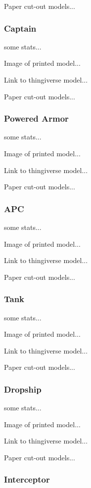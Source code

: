 \documentclass{article}
\begin{document}
Paper cut-out models...

\subsubsection{Captain}

some stats...

Image of printed model...

Link to thingiverse model...

Paper cut-out models...

\subsubsection{Powered Armor}

some stats...

Image of printed model...

Link to thingiverse model...

Paper cut-out models...

\subsubsection{APC}

some stats...

Image of printed model...

Link to thingiverse model...

Paper cut-out models...

\subsubsection{Tank}

some stats...

Image of printed model...

Link to thingiverse model...

Paper cut-out models...

\subsubsection{Dropship}

some stats...

Image of printed model...

Link to thingiverse model...

Paper cut-out models...

\subsubsection{Interceptor}
\end{document}
